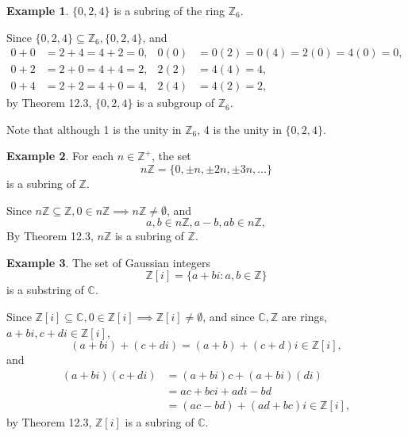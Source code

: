 \documentclass{article}
\theoremstyle{definition}
\newtheorem{example}{Example}[section]
\begin{document}
    \begin{example}
        $\{0,2,4\}$ is a subring of the ring $\mathbb{Z}_6$. 
        
        Since $\{0,2,4\}\subseteq\mathbb{Z}_6,\{0,2,4\}$, and
        \begin{align*}
            0+0&=2+4=4+2=0, & 0(0)&=0(2)=0(4)=2(0)=4(0)=0, \\
            0+2&=2+0=4+4=2, & 2(2)&=4(4)=4,\\
            0+4&=2+2=4+0=4, & 2(4)&=4(2)=2,
        \end{align*}
        by Theorem 12.3, $\{0,2,4\}$ is a subgroup of $\mathbb{Z}_6$.
        
        Note that although 1 is the unity in $\mathbb{Z}_6$, 4 is the unity in $\{0,2,4\}$.
    \end{example}
    
    \begin{example}
        For each $n \in \mathbb{Z}^+$, the set
        \begin{equation*}
            n\mathbb{Z}=\{0,\pm n, \pm 2n, \pm 3n, \dots\}
        \end{equation*}
        is a subring of $\mathbb{Z}$.
        
        Since $n\mathbb{Z} \subseteq \mathbb{Z}, 0\in n\mathbb{Z} \implies n\mathbb{Z}\neq\emptyset$, and
        \begin{equation*}
            a,b \in n\mathbb{Z}, a-b,ab\in n\mathbb{Z},
        \end{equation*}
        By Theorem 12.3, $n\mathbb{Z}$ is a subring of $\mathbb{Z}$.
    \end{example}
    
    \begin{example}
        The set of Gaussian integers
        \begin{equation*}
            \mathbb{Z}[i]=\{a+bi:a,b\in\mathbb{Z}\}
        \end{equation*}
        is a substring of $\mathbb{C}$.
        
        Since $\mathbb{Z}[i] \subseteq\mathbb{C}, 0\in\mathbb{Z}[i]\implies\mathbb{Z}[i]\neq\emptyset$, and since $\mathbb{C},\mathbb{Z}$ are rings, $a+bi,c+di \in \mathbb{Z}[i]$,
        \begin{equation*}
             (a+bi)+(c+di)=(a+b)+(c+d)i \in \mathbb{Z}[i],
        \end{equation*}
        and
        \begin{align*}
            (a+bi)(c+di)&=(a+bi)c+(a+bi)(di) \\
            &= ac+bci+adi-bd \\
            &= (ac-bd)+(ad+bc)i\in\mathbb{Z}[i],
        \end{align*}
        by Theorem 12.3, $\mathbb{Z}[i]$ is a subring of $\mathbb{C}$.
    \end{example}
    
\end{document}
